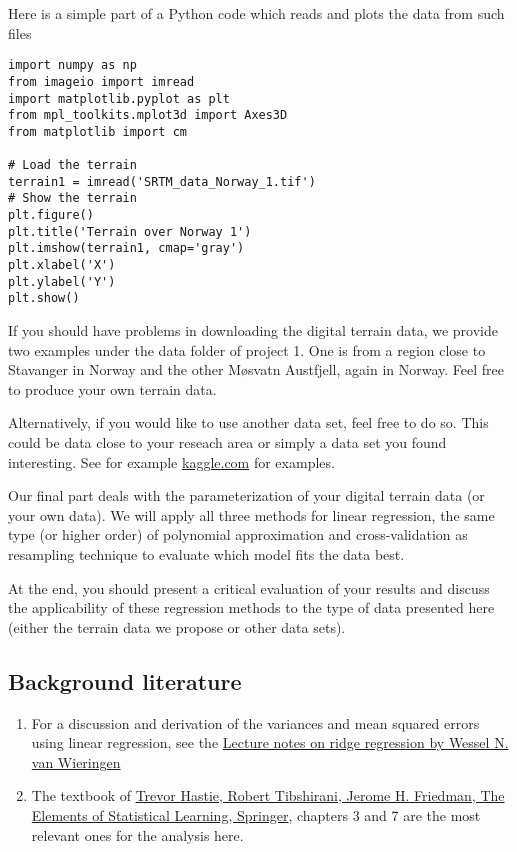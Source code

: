 \documentclass[%
oneside,                 %
final,                   %
10pt]{article}
\begin{document}
Here is a simple part of a Python code which reads and plots the data
from such files

\begin{verbatim}
import numpy as np
from imageio import imread
import matplotlib.pyplot as plt
from mpl_toolkits.mplot3d import Axes3D
from matplotlib import cm

# Load the terrain
terrain1 = imread('SRTM_data_Norway_1.tif')
# Show the terrain
plt.figure()
plt.title('Terrain over Norway 1')
plt.imshow(terrain1, cmap='gray')
plt.xlabel('X')
plt.ylabel('Y')
plt.show()
\end{verbatim}

If you should have problems in downloading the digital terrain data,
we provide two examples under the data folder of project 1. One is
from a region close to Stavanger in Norway and the other Møsvatn
Austfjell, again in Norway.
Feel free to produce your own terrain data.


Alternatively, if you would like to use another data set, feel free to do so. This could be data close to your reseach area or simply a data set you found interesting. See for example \href{{https://www.kaggle.com/datasets}}{kaggle.com} for examples.


Our final part deals with the parameterization of your digital terrain
data (or your own data).  We will apply all three methods for linear regression, the same type (or higher order) of polynomial
approximation and cross-validation as resampling technique to evaluate which
model fits the data best.

At the end, you should present a critical evaluation of your results
and discuss the applicability of these regression methods to the type
of data presented here (either the terrain data we propose or other data sets).




\subsection*{Background literature}

\begin{enumerate}
\item For a discussion and derivation of the variances and mean squared errors using linear regression, see the \href{{https://arxiv.org/abs/1509.09169}}{Lecture notes on ridge regression by Wessel N. van Wieringen}

\item The textbook of \href{{https://www.springer.com/gp/book/9780387848570}}{Trevor Hastie, Robert Tibshirani, Jerome H. Friedman, The Elements of Statistical Learning, Springer}, chapters 3 and 7 are the most relevant ones for the analysis here. 
\end{enumerate}
\end{document}
